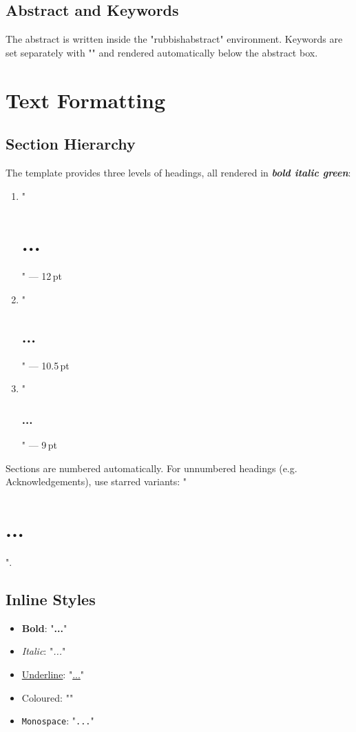 \documentclass{rubbish}
\begin{document}
\begin{rubbishbody}
\subsection{Abstract and Keywords}

The abstract is written inside the "rubbishabstract" environment.
Keywords are set separately with
"" and rendered
automatically below the abstract box.

\section{Text Formatting}

\subsection{Section Hierarchy}

The template provides three levels of headings, all rendered in
\textbf{\emph{\textcolor{rubbishgreen}{bold italic green}}}:

\begin{enumerate}[leftmargin=*, itemsep=2pt]
  \item "\section{...}" --- 12\,pt
  \item "\subsection{...}" --- 10.5\,pt
  \item "\subsubsection{...}" --- 9\,pt
\end{enumerate}

\noindent Sections are numbered automatically. For unnumbered headings
(e.g. Acknowledgements), use starred variants:
"\section*{...}".

\subsection{Inline Styles}

\begin{itemize}[leftmargin=*, itemsep=2pt]
  \item \textbf{Bold}: "\textbf{...}"
  \item \textit{Italic}: "\textit{...}"
  \item \underline{Underline}: "\underline{...}"
  \item \textcolor{rubbishgreen}{Coloured}:
        "\textcolor{...}"
  \item \texttt{Monospace}: "\texttt{...}"
\end{itemize}


\end{rubbishbody}
\end{document}

